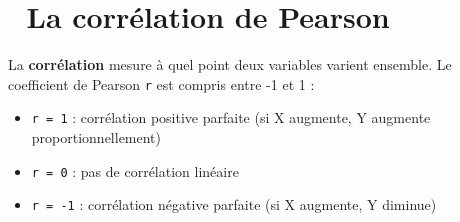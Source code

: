 \documentclass[
  french,
  11pt,
  a4paper,
]{scrbook}
\providecommand{\tightlist}{%
  \setlength{\itemsep}{0pt}\setlength{\parskip}{0pt}}
\begin{document}
\section{🔗 La corrélation de
Pearson}\label{la-corruxe9lation-de-pearson}

La \textbf{corrélation} mesure à quel point deux variables varient
ensemble. Le coefficient de Pearson \texttt{r} est compris entre -1 et 1
:

\begin{itemize}
\tightlist
\item
  \texttt{r\ =\ 1} : corrélation positive parfaite (si X augmente, Y
  augmente proportionnellement)
\item
  \texttt{r\ =\ 0} : pas de corrélation linéaire
\item
  \texttt{r\ =\ -1} : corrélation négative parfaite (si X augmente, Y
  diminue)
\end{itemize}
\end{document}

